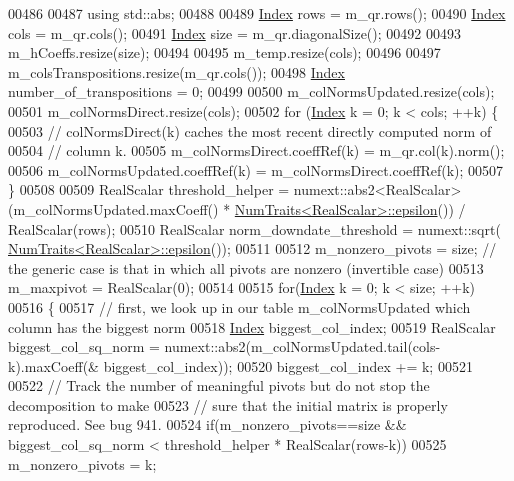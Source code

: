\begin{DoxyCode}
00486 
00487   \textcolor{keyword}{using} std::abs;
00488 
00489   \hyperlink{namespace_eigen_a62e77e0933482dafde8fe197d9a2cfde}{Index} rows = m\_qr.rows();
00490   \hyperlink{namespace_eigen_a62e77e0933482dafde8fe197d9a2cfde}{Index} cols = m\_qr.cols();
00491   \hyperlink{namespace_eigen_a62e77e0933482dafde8fe197d9a2cfde}{Index} size = m\_qr.diagonalSize();
00492 
00493   m\_hCoeffs.resize(size);
00494 
00495   m\_temp.resize(cols);
00496 
00497   m\_colsTranspositions.resize(m\_qr.cols());
00498   \hyperlink{namespace_eigen_a62e77e0933482dafde8fe197d9a2cfde}{Index} number\_of\_transpositions = 0;
00499 
00500   m\_colNormsUpdated.resize(cols);
00501   m\_colNormsDirect.resize(cols);
00502   \textcolor{keywordflow}{for} (\hyperlink{namespace_eigen_a62e77e0933482dafde8fe197d9a2cfde}{Index} k = 0; k < cols; ++k) \{
00503     \textcolor{comment}{// colNormsDirect(k) caches the most recent directly computed norm of}
00504     \textcolor{comment}{// column k.}
00505     m\_colNormsDirect.coeffRef(k) = m\_qr.col(k).norm();
00506     m\_colNormsUpdated.coeffRef(k) = m\_colNormsDirect.coeffRef(k);
00507   \}
00508 
00509   RealScalar threshold\_helper =  numext::abs2<RealScalar>(m\_colNormsUpdated.maxCoeff() * 
      \hyperlink{group___core___module_struct_eigen_1_1_num_traits}{NumTraits<RealScalar>::epsilon}()) / RealScalar(rows);
00510   RealScalar norm\_downdate\_threshold = numext::sqrt(
      \hyperlink{group___core___module_struct_eigen_1_1_num_traits}{NumTraits<RealScalar>::epsilon}());
00511 
00512   m\_nonzero\_pivots = size; \textcolor{comment}{// the generic case is that in which all pivots are nonzero (invertible case)}
00513   m\_maxpivot = RealScalar(0);
00514 
00515   \textcolor{keywordflow}{for}(\hyperlink{namespace_eigen_a62e77e0933482dafde8fe197d9a2cfde}{Index} k = 0; k < size; ++k)
00516   \{
00517     \textcolor{comment}{// first, we look up in our table m\_colNormsUpdated which column has the biggest norm}
00518     \hyperlink{namespace_eigen_a62e77e0933482dafde8fe197d9a2cfde}{Index} biggest\_col\_index;
00519     RealScalar biggest\_col\_sq\_norm = numext::abs2(m\_colNormsUpdated.tail(cols-k).maxCoeff(&
      biggest\_col\_index));
00520     biggest\_col\_index += k;
00521 
00522     \textcolor{comment}{// Track the number of meaningful pivots but do not stop the decomposition to make}
00523     \textcolor{comment}{// sure that the initial matrix is properly reproduced. See bug 941.}
00524     \textcolor{keywordflow}{if}(m\_nonzero\_pivots==size && biggest\_col\_sq\_norm < threshold\_helper * RealScalar(rows-k))
00525       m\_nonzero\_pivots = k;

\end{DoxyCode}
